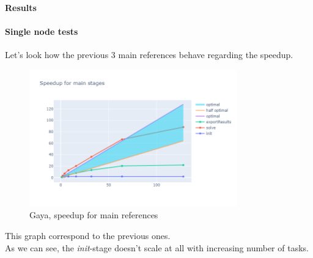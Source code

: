 \documentclass[10pt]{beamer}
\begin{document}
\begin{frame}{\textbf{Results}}
    \framesubtitle{\textbf{Single node tests}}
    Let's look how the previous 3 main references behave regarding the speedup.

    \begin{figure}[h]
        \centering
        \includegraphics[width=0.8\textwidth]{../illustrations/gaya-graphs/gayaSpeedup.png}
        \vspace{-20pt}
        \caption{Gaya, speedup for main references}
    \end{figure}

    This graph correspond to the previous ones. \\
    As we can see, the \textit{init}-stage doesn't scale at all with increasing number of tasks.
\end{frame}
\end{document}
